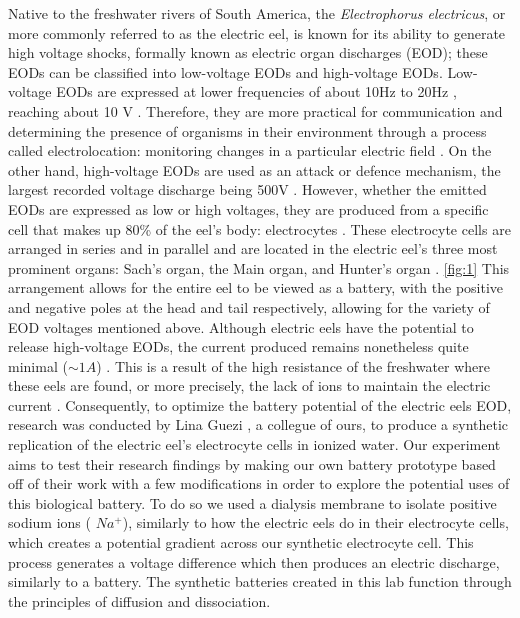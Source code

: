 \documentclass[letterpaper]{article}
\begin{document}
Native to the freshwater rivers of South America, the \textit{Electrophorus electricus}, or more 
commonly referred to as the electric eel, is known for its ability to generate high voltage shocks,
formally known as electric organ discharges (EOD); these EODs can be classified into low-voltage 
EODs and high-voltage EODs. Low-voltage EODs are expressed at lower frequencies of about 10Hz to
20Hz \parencite{cataniaAstonishingBehaviorElectric2019}, reaching about 10 V \parencite{ElectricCircuits6ElectricEels2015}. 
Therefore, they are more practical for communication and determining the presence of organisms 
in their environment through a process called electrolocation: monitoring 
changes in a particular electric field \parencite{bennettComparativePhysiologyElectric1970}. 
On the other hand, high-voltage EODs are used as an attack or defence mechanism,
the largest recorded voltage discharge being 500V \parencite{ElectricCircuits6ElectricEels2015}.
However, whether the emitted EODs are expressed as low or high 
voltages, they are produced from a specific cell that makes up 80\% of the eel’s body: electrocytes
\parencite{carlsonAnimalBehaviorElectric2015}. These electrocyte cells are arranged in series and 
in parallel and are located in the electric eel’s three most prominent organs: Sach’s organ, the 
Main organ, and Hunter’s organ \parencite{ElectricCircuits6ElectricEels2015}. \ref{fig:1} This 
arrangement allows for the entire eel to be viewed as a battery, with the positive and negative 
poles at the head and tail respectively, allowing for the variety of EOD voltages mentioned above. 
Although electric eels have the potential to release high-voltage EODs, the current produced remains
nonetheless quite minimal ($\sim 1 A$) \parencite{ElectricCircuits6ElectricEels2015}. This is a result 
of the high resistance of the freshwater where these eels are found, or more precisely, the lack of 
ions to maintain the electric current \parencite{boisseletBiomimeticPotentialElectric2017}. 
Consequently, to optimize the battery potential of the electric eels EOD, research was conducted 
by Lina Guezi \parencite{gueziTheoreticalExaminationConception2023}, a collegue of ours, to produce 
a synthetic replication of the electric eel’s electrocyte 
cells in ionized water. Our experiment aims to test their research findings by making our own battery prototype based off of their work with a few modifications in order to explore 
the potential uses of this biological battery. To do so we used a dialysis membrane to isolate positive sodium ions ( $Na^+$), similarly to how the electric eels do in their
electrocyte cells, which creates a potential gradient across our synthetic electrocyte cell.
This process generates a voltage difference which then produces an electric discharge, 
similarly to a battery. The synthetic batteries created in this lab function through the
principles of diffusion and dissociation. 
\end{document}
